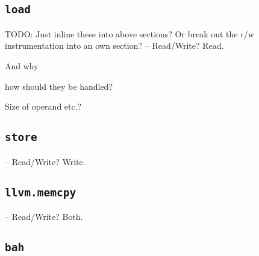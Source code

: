 \subsection {\texttt{load}}

TODO: Just inline these into above sections? Or break out the r/w
instrumentation into an own section?
-- Read/Write? Read.

And why

how should they be handled?

Size of operand etc.?

\subsection {\texttt{store}}

-- Read/Write? Write.

\subsection {\texttt{llvm.memcpy}}

-- Read/Write? Both.

\subsection {\texttt{bah}}

